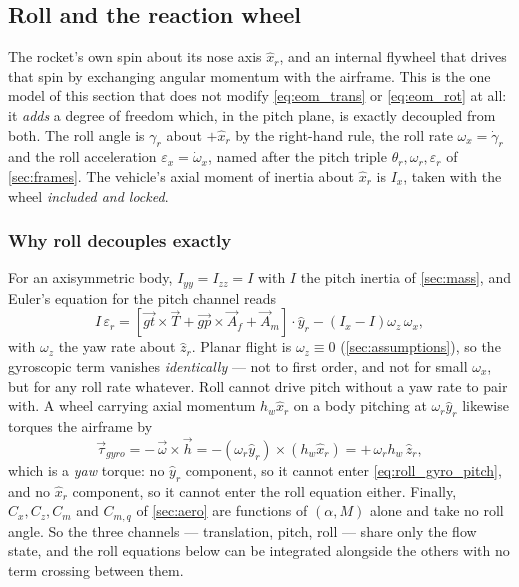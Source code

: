 \begin{aitext}
\subsection{Roll and the reaction wheel}\label{sec:roll}
The rocket's own spin about its nose axis $\hat{x}_r$, and an internal flywheel that drives that
spin by exchanging angular momentum with the airframe. This is the one model of this section that
does not modify \autoref{eq:eom_trans} or \autoref{eq:eom_rot} at all: it \emph{adds} a degree of
freedom which, in the pitch plane, is exactly decoupled from both. The roll angle is $\gamma_r$
about $+\hat{x}_r$ by the right-hand rule, the roll rate $\omega_x=\dot\gamma_r$ and the roll
acceleration $\varepsilon_x=\dot\omega_x$, named after the pitch triple $\theta_r,\omega_r,
\varepsilon_r$ of \autoref{sec:frames}. The vehicle's axial moment of inertia about $\hat{x}_r$ is
$I_x$, taken with the wheel \emph{included and locked}.

\subsubsection{Why roll decouples exactly}\label{sec:roll_decoupling}
For an axisymmetric body, $I_{yy}=I_{zz}=I$ with $I$ the pitch inertia of \autoref{sec:mass}, and
Euler's equation for the pitch channel reads
\begin{equation} \label{eq:roll_gyro_pitch}
    I\,\varepsilon_r = \left[\vec{gt}\times\vec{T} + \vec{gp}\times\vec{A}_f
        + \vec{A}_m\right]\cdot\hat{y}_r - \left(I_x-I\right)\omega_z\,\omega_x,
\end{equation}
with $\omega_z$ the yaw rate about $\hat{z}_r$. Planar flight is $\omega_z\equiv0$
(\autoref{sec:assumptions}), so the gyroscopic term vanishes \emph{identically} --- not to first
order, and not for small $\omega_x$, but for any roll rate whatever. Roll cannot drive pitch
without a yaw rate to pair with. A wheel carrying axial momentum $h_w\hat{x}_r$ on a body pitching
at $\omega_r\hat{y}_r$ likewise torques the airframe by
\begin{equation} \label{eq:roll_gyro_wheel}
    \vec{\tau}_{gyro} = -\,\vec{\omega}\times\vec{h}
        = -\left(\omega_r\hat{y}_r\right)\times\left(h_w\hat{x}_r\right)
        = +\,\omega_r h_w\,\hat{z}_r,
\end{equation}
which is a \emph{yaw} torque: no $\hat{y}_r$ component, so it cannot enter
\autoref{eq:roll_gyro_pitch}, and no $\hat{x}_r$ component, so it cannot enter the roll equation
either. Finally, $C_x,C_z,C_m$ and $C_{m,q}$ of \autoref{sec:aero} are functions of $(\alpha,M)$
alone and take no roll angle. So the three channels --- translation, pitch, roll --- share only the
flow state, and the roll equations below can be integrated alongside the others with no term
crossing between them.


\end{aitext}
